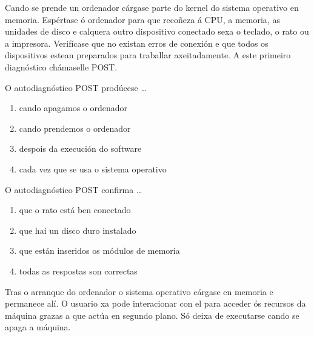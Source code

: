 
Cando se prende un ordenador cárgase parte do kernel do  sistema operativo en memoria. Espértase ó ordenador para que recoñeza á CPU, a memoria, as unidades de disco e calquera outro dispositivo conectado sexa o teclado, o rato ou a impresora. Verifícase que no existan erros de conexión e que todos os dispositivos estean preparados para traballar axeitadamente. A este primeiro diagnóstico chámaselle POST.\\

\begin{diapo}\begin{frame}{O autodiagnóstico POST prodúcese \dots}
\begin{enumerate}
\item cando apagamos o ordenador\pause
\item cando prendemos o ordenador\pause
\item despois da execución do software \pause
\item cada vez que se usa o sistema operativo 
\end{enumerate}
\end{frame} 
\end{diapo} 
\begin{diapo}\begin{frame}{O autodiagnóstico POST confirma \dots}
\begin{enumerate}
\item que o rato está ben conectado \pause
\item que hai un disco duro instalado \pause
\item que están inseridos os módulos de memoria \pause
\item todas as respostas son correctas
\end{enumerate}
\end{frame} 
\end{diapo} 

Tras o arranque do ordenador o sistema operativo cárgase en memoria e permanece alí. O usuario xa pode interacionar con el para acceder ós recursos da máquina grazas a que actúa en segundo plano. Só deixa de executarse cando se apaga a máquina. 


